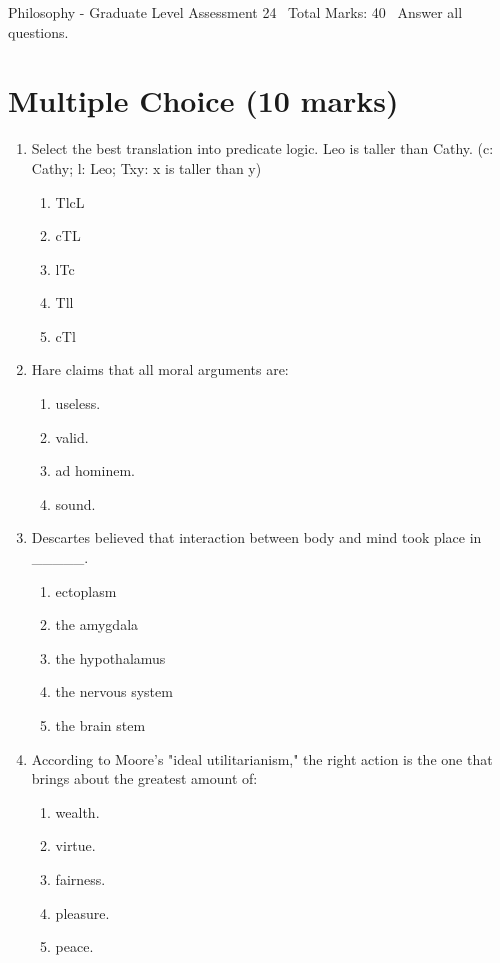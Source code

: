 \documentclass[12pt]{article}
\begin{document}
\begin{center}
Philosophy - Graduate Level Assessment 24 \
Total Marks: 40 \
Answer all questions.
\end{center}

\section*{Multiple Choice (10 marks)}
\begin{enumerate}[label=\arabic*.]
\item Select the best translation into predicate logic. Leo is taller than Cathy. (c: Cathy; l: Leo; Txy: x is taller than y)
\begin{enumerate}[label=(\alph*)]
    \item TlcL
    \item cTL
    \item lTc
    \item Tll
    \item cTl
\end{enumerate}
\item Hare claims that all moral arguments are:
\begin{enumerate}[label=(\alph*)]
    \item useless.
    \item valid.
    \item ad hominem.
    \item sound.
\end{enumerate}
\item Descartes believed that interaction between body and mind took place in \_\_\_\_\_.
\begin{enumerate}[label=(\alph*)]
    \item ectoplasm
    \item the amygdala
    \item the hypothalamus
    \item the nervous system
    \item the brain stem
\end{enumerate}
\item According to Moore's "ideal utilitarianism," the right action is the one that brings about the greatest amount of:
\begin{enumerate}[label=(\alph*)]
    \item wealth.
    \item virtue.
    \item fairness.
    \item pleasure.
    \item peace.

\end{enumerate}
\end{enumerate}
\end{document}
